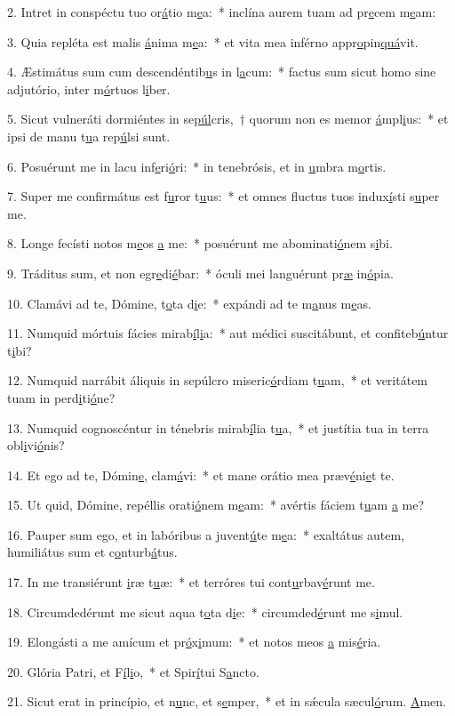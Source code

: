 2. Intret in conspéctu tuo or\uline{á}tio m\uline{e}a:~* inclína aurem tuam ad pr\uline{e}cem m\uline{e}am:\par 
3. Quia repléta est malis \uline{á}nima m\uline{e}a:~* et vita mea inférno appr\uline{o}pin\uline{quá}vit.\par 
4. Æstimátus sum cum descendéntib\uline{u}s in l\uline{a}cum:~* factus sum sicut homo sine adjutório, inter m\uline{ó}rtuos l\uline{i}ber.\par 
5. Sicut vulneráti dormiéntes in se\uline{púl}cris,~† quorum non es memor \uline{á}mpl\uline{i}us:~* et ipsi de manu t\uline{u}a rep\uline{ú}lsi sunt.\par 
6. Posuérunt me in lacu inf\uline{e}ri\uline{ó}ri:~* in tenebrósis, et in \uline{u}mbra m\uline{o}rtis.\par 
7. Super me confirmátus est f\uline{u}ror t\uline{u}us:~* et omnes fluctus tuos indux\uline{í}sti s\uline{u}per me.\par 
8. Longe fecísti notos m\uline{e}os \uline{a} me:~* posuérunt me abominati\uline{ó}nem s\uline{i}bi.\par 
9. Tráditus sum, et non egr\uline{e}di\uline{é}bar:~* óculi mei languérunt pr\uline{æ} in\uline{ó}pia.\par 
10. Clamávi ad te, Dómine, t\uline{o}ta d\uline{i}e:~* expándi ad te m\uline{a}nus m\uline{e}as.\par 
11. Numquid mórtuis fácies mirab\uline{í}l\uline{i}a:~* aut médici suscitábunt, et confiteb\uline{ú}ntur t\uline{i}bi?\par 
12. Numquid narrábit áliquis in sepúlcro miseric\uline{ó}rdiam t\uline{u}am,~* et veritátem tuam in perd\uline{i}ti\uline{ó}ne?\par 
13. Numquid cognoscéntur in ténebris mirab\uline{í}lia t\uline{u}a,~* et justítia tua in terra obl\uline{i}vi\uline{ó}nis?\par 
14. Et ego ad te, Dómin\uline{e}, clam\uline{á}vi:~* et mane orátio mea præv\uline{é}ni\uline{e}t te.\par 
15. Ut quid, Dómine, repéllis orati\uline{ó}nem m\uline{e}am:~* avértis fáciem t\uline{u}am \uline{a} me?\par 
16. Pauper sum ego, et in labóribus a juvent\uline{ú}te m\uline{e}a:~* exaltátus autem, humiliátus sum et c\uline{o}nturb\uline{á}tus.\par 
17. In me transiérunt \uline{i}ræ t\uline{u}æ:~* et terróres tui cont\uline{u}rbav\uline{é}runt me.\par 
18. Circumdedérunt me sicut aqua t\uline{o}ta d\uline{i}e:~* circumded\uline{é}runt me s\uline{i}mul.\par 
19. Elongásti a me amícum et pr\uline{ó}x\uline{i}mum:~* et notos meos \uline{a} mis\uline{é}ria.\par 
20. Glória Patri, et F\uline{í}l\uline{i}o,~* et Spir\uline{í}tui S\uline{a}ncto.\par 
21. Sicut erat in princípio, et n\uline{u}nc, et s\uline{e}mper,~* et in sǽcula sæcul\uline{ó}rum. \uline{A}men.\par 
